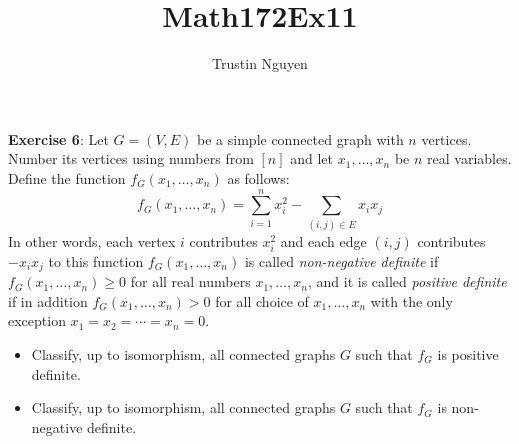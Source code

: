 \documentclass{article}
\title{Math172Ex11}
\author{Trustin Nguyen}
\begin{document}
    \maketitle

\reversemarginpar

\textbf{Exercise 6}: Let $G = (V, E)$ be a simple connected graph with $n$ vertices. Number its vertices using numbers from $[n]$ and let $x_{1}, \ldots, x_{n}$ be $n$ real variables. Define the function $f_{G}(x_{1}, \ldots, x_{n})$ as follows:
    \begin{equation*}
        f_{G}(x_{1}, \ldots, x_{n}) = \sum_{i = 1}^{n}x_{i}^{2} - \sum_{(i, j) \in E}x_{i}x_{j}
    \end{equation*}
In other words, each vertex $i$ contributes $x_{i}^{2}$ and each edge $(i, j)$ contributes $-x_{i}x_{j}$ to this function $f_{G}(x_{1}, \ldots, x_{n})$ is called \textit{non-negative definite} if $f_{G}(x_{1}, \ldots, x_{n}) \geq 0$ for all real numbers $x_{1}, \ldots, x_{n}$, and it is called \textit{positive definite} if in addition $f_{G}(x_{1}, \ldots, x_{n}) > 0$ for all choice of $x_{1}, \ldots, x_{n}$ with the only exception $x_{1} = x_{2} = \cdots = x_{n} = 0$.
    \begin{itemize}
        \item Classify, up to isomorphism, all connected graphs $G$ such that $f_{G}$ is positive definite.

        \item Classify, up to isomorphism, all connected graphs $G$ such that $f_{G}$ is non-negative definite. 
    \end{itemize}
\end{document}
